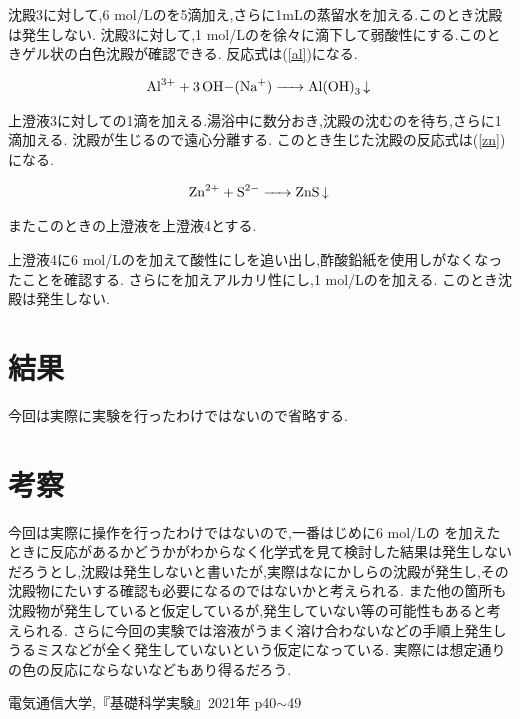 \documentclass[a4j,10pt]{jarticle}
\begin{document}
  沈殿3に対して,6 mol/Lのを5滴加え,さらに1mLの蒸留水を加える.このとき沈殿は発生しない.
  沈殿3に対して,1 mol/Lのを徐々に滴下して弱酸性にする.このときゲル状の白色沈殿が確認できる.
  反応式は(\ref{al})になる.

  \begin{eqnarray}
    \label{al}
    \ce{Al^3+ + 3OH-(Na+) -> Al(OH)3 v}
  \end{eqnarray}

  上澄液3に対しての1滴を加える.湯浴中に数分おき,沈殿の沈むのを待ち,さらに1滴加える.
  沈殿が生じるので遠心分離する.
  このとき生じた沈殿の反応式は(\ref{zn})になる.

  \begin{eqnarray}
    \label{zn}
    \ce{Zn^2+ + S^2- -> ZnS v}
  \end{eqnarray}

  またこのときの上澄液を上澄液4とする.

  上澄液4に6 mol/Lのを加えて酸性にしを追い出し,酢酸鉛紙を使用しがなくなったことを確認する.
  さらにを加えアルカリ性にし,1 mol/Lのを加える.
  このとき沈殿は発生しない.

  \section{結果}
  今回は実際に実験を行ったわけではないので省略する.
  \section{考察}
  今回は実際に操作を行ったわけではないので,一番はじめに6 mol/Lの を加えたときに反応があるかどうかがわからなく化学式を見て検討した結果は発生しないだろうとし,沈殿は発生しないと書いたが,実際はなにかしらの沈殿が発生し,その沈殿物にたいする確認も必要になるのではないかと考えられる.
  また他の箇所も沈殿物が発生していると仮定しているが,発生していない等の可能性もあると考えられる.
  さらに今回の実験では溶液がうまく溶け合わないなどの手順上発生しうるミスなどが全く発生していないという仮定になっている.
  実際には想定通りの色の反応にならないなどもあり得るだろう.

  \begin{thebibliography}{9}
     電気通信大学,『基礎科学実験』2021年 p40$\sim$49
    \end{thebibliography}
    
\end{document}
